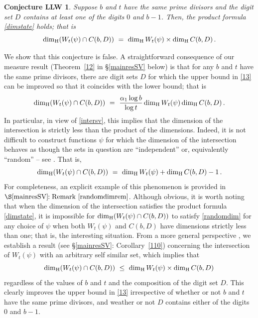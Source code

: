 \documentclass[12pt]{article}
\newtheorem*{llwconj}{Conjecture LLW}
\theoremstyle{definition}
\theoremstyle{remark}
\begin{document}
\begin{llwconj} 
Suppose $b$ and $t$ have the same prime divisors  and the digit set  $D$ contains at least one of the digits $0$ and $b-1$.  Then,  the product formula  \eqref{dimstate} holds;  that is
$$
\dim_{\rm H}(W_{t}(\psi)\cap C(b,D))  \  =  \  \dim_{\rm H}W_{t}(\psi)   \times \dim_{\rm H}C(b,D)  \, .
$$
\end{llwconj}

\noindent We show that this conjecture is false. A straightforward consequence of our measure result (Theorem~\ref{12} in \S\ref{mainresSV} below) is that for any $b$ and $t$ have the same prime divisors,  there are digit sets $D$ for which the upper bound in \eqref{13}  can be improved so that it coincides with the lower bound;  that is
\begin{equation}   \label{dimintro}
\dim_{\rm H}(W_{t}(\psi)\cap C(b,D)) \  =  \ \frac{\alpha_{1}\log b}{\log t}\dim_{\rm H}W_{t}(\psi)\dim_{\rm H}C(b,D)  \, .
\end{equation}
In particular,  in view of \eqref{intersv},  this implies that the dimension of the intersection is strictly less than the product of the dimensions.  Indeed, it is not difficult to construct  functions $\psi $ for which the dimension of the intersection behaves as though the sets in question are “independent” or, equivalently “random”  -- see \cite[Chapter~8]{F2003}.  That is,
 \begin{equation} \label{randomdim} \dim_{\rm H}(W_{t}(\psi)\cap C(b,D)) \  =  \ \dim_{\rm H}W_{t}(\psi)+\dim_{\rm H}C(b,D)-1  \, .  \end{equation}
 For completeness, an explicit example of this  phenomenon  is provided  in  $\S\ref{mainresSV}\!\!: {\rm Remark}~\ref{randomdimrem}$.   Although obvious, it is worth noting that when  the dimension of the intersection  satisfies the product formula   \eqref{dimstate},  it is impossible for
$\dim_{\rm H}( W_{t}(\psi)\cap C(b,D))   $ to satisfy \eqref{randomdim} for any choice of  $\psi$ when both $W_{t}(\psi)$ and $C(b,D)$ have dimensions strictly less than one; that is, the interesting situation.     From a more general perspective ,  we establish a  result (see  \S\ref{mainresSV}: Corollary~\ref{110})  concerning the intersection of $W_{t}(\psi)$ with an  arbitrary self similar set, which implies  that
 \begin{equation}  \label{genupper}
\dim_{\rm H}(W_{t}(\psi)\cap C(b,D))  \ \le  \  \dim_{\rm H}W_{t}(\psi)   \times \dim_{\rm H}C(b,D)  \,
\end{equation}
  regardless of the values of $b$ and  $t$ and the composition of the digit set $D$.
  This clearly   improves the upper bound in \eqref{13}  irrespective of whether  or not $ b$ and $t$ have the same prime divisors, and weather or not $D$ contains either of the digits $0$ and $b-1$.
\end{document}
